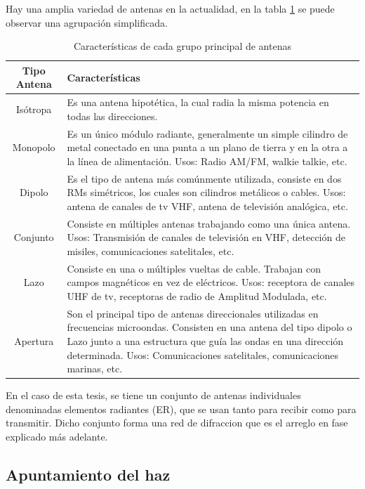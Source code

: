 Hay una amplia variedad de antenas en la actualidad, en la tabla \ref{tab:type_antennas} se puede observar una agrupación 
simplificada.

\begin{table}[H]
  \footnotesize
  \centering
  \begin{tabular}{|c|p{9cm}|}
	\hline
	\textbf{Tipo Antena} & \textbf{Características} \\\hline
	Isótropa & Es una antena hipotética, la cual radia la misma potencia en todas las direcciones.\\\hline
	Monopolo & Es un único módulo radiante, generalmente un simple cilindro de metal conectado en una punta a un plano de
	tierra y en la otra a la línea de alimentación. Usos: Radio AM/FM, walkie talkie, etc. \\\hline
	Dipolo & Es el tipo de antena más comúnmente utilizada, consiste en dos RMs simétricos, los cuales son cilindros
	metálicos o cables. Usos: antena de canales de tv VHF, antena de televisión analógica, etc. \\\hline
	Conjunto & Consiste en múltiples antenas trabajando como una única antena. Usos: Transmisión de canales de televisión en VHF,
	detección de misiles, comunicaciones satelitales, etc.\\\hline
	Lazo & Consiste en una o múltiples vueltas de cable. Trabajan con campos magnéticos en vez de eléctricos. Usos: receptora
	de canales UHF de tv, receptoras de radio de Amplitud Modulada, etc.\\\hline
	Apertura & Son el principal tipo de antenas direccionales utilizadas en frecuencias microondas. Consisten en una antena
	del tipo dipolo o Lazo junto a una estructura que guía las ondas en una dirección determinada. Usos: Comunicaciones
	satelitales, comunicaciones marinas, etc.\\\hline
  \end{tabular}
  \caption{Características de cada grupo principal de antenas}
  \label{tab:type_antennas}
\end{table}


En el caso de esta tesis, se tiene un conjunto de antenas individuales denominadas elementos radiantes (ER), que se usan tanto
para recibir como para transmitir. Dicho conjunto forma una red de difraccion que es el arreglo en fase explicado más adelante.


\subsection{Apuntamiento del haz} 

